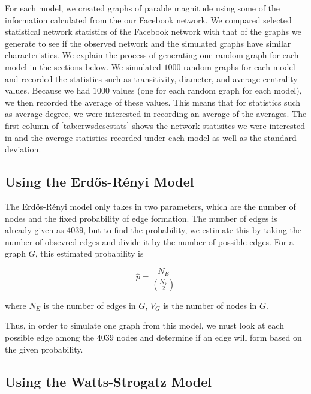 \documentclass[12pt,twoside]{amherstthesis}
\begin{document}
  For each model, we created graphs of parable magnitude using some of the
  information calculated from the our Facebook network. We compared
  selected statistical network statistics of the Facebook network with
  that of the graphs we generate to see if the observed network and the
  simulated graphs have similar characteristics. We explain the process of
  generating one random graph for each model in the sections below. We
  simulated \(1000\) random graphs for each model and recorded the
  statistics such as transitivity, diameter, and average centrality
  values. Because we had \(1000\) values (one for each random graph for
  each model), we then recorded the average of these values. This means
  that for statistics such as average degree, we were interested in
  recording an average of the averages. The first column of
  \autoref{tab:erwsdescstats} shows the network statisitcs we were
  interested in and the average statistics recorded under each model as
  well as the standard deviation.
  
  \subsection{Using the Erdős-Rényi
  Model}\label{using-the-erdos-renyi-model}
  
  The Erdős-Rényi model only takes in two parameters, which are the number
  of nodes and the fixed probability of edge formation. The number of
  edges is already given as \(4039\), but to find the probability, we
  estimate this by taking the number of obsevred edges and divide it by
  the number of possible edges. For a graph \(G\), this estimated
  probability is
  
  \[\hat{p} = \frac {N_{E}} {{N_{V} \choose 2}}\]
  
  where \(N_{E}\) is the number of edges in \(G\), \(V_G\) is the number
  of nodes in \(G\).
  
  Thus, in order to simulate one graph from this model, we must look at
  each possible edge among the \(4039\) nodes and determine if an edge
  will form based on the given probability.
  
  \subsection{Using the Watts-Strogatz
  Model}\label{using-the-watts-strogatz-model}
  
\end{document}
